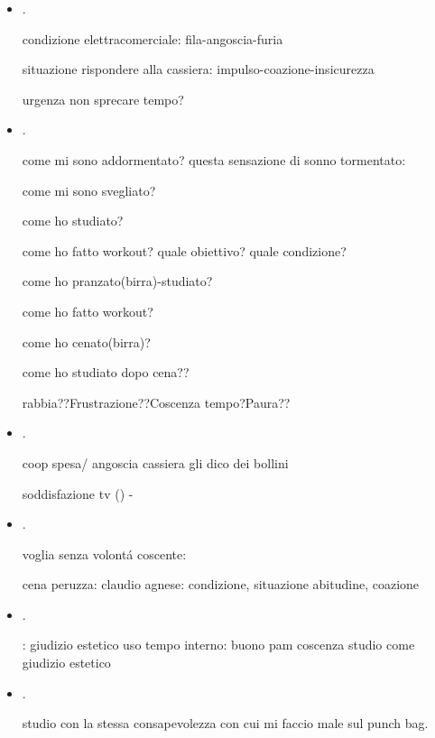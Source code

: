 \begin{itemize}
\item {}.

condizione elettracomerciale: fila-angoscia-furia

situazione rispondere alla cassiera: impulso-coazione-insicurezza

urgenza non sprecare tempo?

\item {}.

come mi sono addormentato? questa sensazione di sonno tormentato: 

come mi sono svegliato?

come ho studiato?

come ho fatto workout? quale obiettivo? quale condizione?

come ho pranzato(birra)-studiato?

come ho fatto workout?

come ho cenato(birra)?

come ho studiato dopo cena??

rabbia??Frustrazione??Coscenza tempo?Paura??

\item {}.

coop spesa/ angoscia cassiera gli dico dei bollini 

soddisfazione tv () - 

\item {}.

voglia senza volont\'a coscente: 

cena peruzza: claudio agnese: condizione, situazione abitudine, coazione

\item {}.

: giudizio estetico uso tempo interno: buono pam
coscenza studio come giudizio estetico 


\item {}.

studio con la stessa consapevolezza con cui mi faccio male sul punch bag.


\end{itemize}
